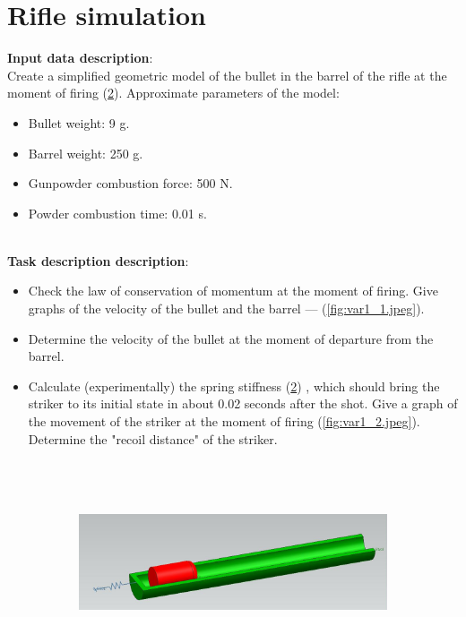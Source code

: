 \documentclass[12pt]{article}
\newcommand\pic[1]{(\cref{#1})} %
\newcommand\ttask[3] 
 {
	\section*{#1}
	\textbf{Input data description}: \\ #2 \  \\
	\textbf{Task description description}: #3
	\newpage
 }
\begin{document}

\ttask{Rifle simulation}{Create a simplified geometric model of the bullet in the barrel of the rifle at the moment of firing \pic{fig:var1_0.jpeg}. Approximate parameters of the model:
	\begin{itemize}
		\item Bullet weight: 9 g.
		\item Barrel weight: 250 g.
		\item Gunpowder combustion force: 500 N.
		\item Powder combustion time: 0.01 s.
	\end{itemize}}{
	\begin{itemize}
		\item Check the law of conservation of momentum at the moment of firing. Give graphs of the velocity of the bullet and the barrel --- \pic{fig:var1_1.jpeg}.
		\item Determine the velocity of the bullet at the moment of departure from the barrel.
		\item Calculate (experimentally) the spring stiffness \pic{fig:var1_0.jpeg} , which should bring the striker to its initial state in about 0.02 seconds after the shot. Give a graph of the movement of the striker at the moment of firing \pic{fig:var1_2.jpeg}. Determine the "recoil distance" of the striker.
	\end{itemize}

	\begin{figure}[H]
		\begin{subfigure}{0.5\textwidth}
			\centering\includegraphics[height=6cm,width=1\textwidth,keepaspectratio]{var1_0.jpeg}
			\caption{}
			\label{fig:var1_0.jpeg}
		\end{subfigure}


\end{figure}}
\end{document}
